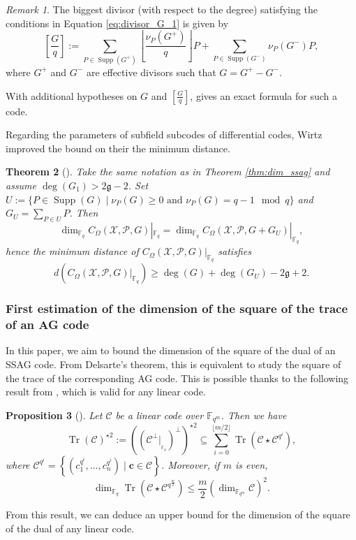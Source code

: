 \documentclass[a4paper]{amsart}
\newtheorem{thm}{Theorem}[section]
\newtheorem{proposition}[thm]{Proposition}
\theoremstyle{definition}
\theoremstyle{remark}
\newtheorem{remark}[thm]{Remark}
\DeclareMathOperator{\trace}{Tr}
\newcommand{\calP}{\mathcal{P}}
\newcommand{\calC}{\mathcal{C}}
\newcommand{\calX}{\mathcal{X}}
\newcommand{\fqm}{\mathbb{F}_{q^m}}
\newcommand{\fq}{\mathbb{F}_{q}}
\newcommand{\Tr}[1]{\trace\!\left(#1\right)}
\newcommand{\set}[1]{\left\{#1\right\}}
\newcommand{\Supp}{\operatorname{Supp}}
\begin{document}
\begin{remark}\label{rk:G/q}
	The biggest divisor (with respect to the degree) satisfying the conditions in Equation \eqref{eq:divisor_G_1} is given by 
	\begin{equation}\label{eq:G/q}
		\left[ \frac{G}{q} \right]:= \sum\limits_{P \in \Supp(G^+)} \left\lfloor\frac{\nu_P(G^+)}{q}\right\rfloor P + \sum\limits_{P \in \Supp(G^-)}\nu_P(G^-)P,
	\end{equation}
	where $G^+$ and $G^-$ are effective divisors such that $G=G^+-G^-$.
\end{remark}

With additional hypotheses on $G$ and $\displaystyle \left[ \frac{G}{q} \right]$, {\cite[Theorem~1]{Le16}} gives an exact formula for such a code.

Regarding the parameters of subfield subcodes of differential codes, Wirtz \cite{W88} improved the bound on their the minimum distance.

\begin{thm}[{\cite[Theorem~2]{W88}}]\label{thm:Wirtz}
	Take the same notation as in Theorem \ref{thm:dim_ssag} and assume $\deg (G_1) > 2 \mathfrak{g}-2$.
	Set $U:=\{P \in \Supp(G) \mid \nu_P(G) \geq 0 \text{ and } \nu_P(G) = q-1 \mod q\}$ and $G_U=\sum_{P \in U} P$. Then
	\[	\dim_{\fq} C_{\Omega}(\calX,\calP,G)|_{\fq} = 	\dim_{\fq} C_{\Omega}(\calX,\calP,G+G_U)|_{\fq}, \]
	hence the minimum distance of $C_{\Omega}(\calX,\calP,G)|_{\fq}$ satisfies
	\[d\left(C_{\Omega}(\calX,\calP,G)|_{\fq} \right) \geq \deg (G) + \deg (G_U) -2\mathfrak{g}+2.\]
\end{thm}


\subsubsection{First estimation of the dimension of the square of the trace of an AG code}

In this paper, we aim to bound the dimension of the square of the dual of an SSAG code. From Delsarte's theorem, this is equivalent to study the square of the trace of the corresponding AG code. 
This is possible thanks to the following result from \cite{MT21}, which is valid for any linear code.

\begin{proposition}[{\cite[Proposition~15]{MT21}}] \label{prop:Tr_BoundSchurSquare}
 Let $\calC$ be a linear code over $\fqm$. Then we have 
 \begin{equation} \label{eq:key_equation} \Tr{\calC}^{\star2} := ((\calC^{\perp}|_{_{{\mathbb{F}_q}}})^{\perp})^{\star2} \subseteq \sum\limits_{i=0}^{\lfloor{m/2} \rfloor} \Tr{\calC\star \calC^{q^i}},
 \end{equation}
where $\calC^{q^i}=\set{\left(c_1^{q^i},\dots,c_n^{q^i}\right) \mid \mathbf{c} \in \calC}$.
Moreover, if $m$ is even, 
 \begin{equation} \label{eq:dim_m/2} \dim_{\fq} \Tr{\calC\star \calC^{q^{\frac{m}{2}}}} \leq \frac{m}{2} (\dim_{\fqm}\calC)^2.
\end{equation}
\end{proposition}
From this result, we can deduce an upper bound for the dimension of the square of the dual of any linear code.
\end{document}
